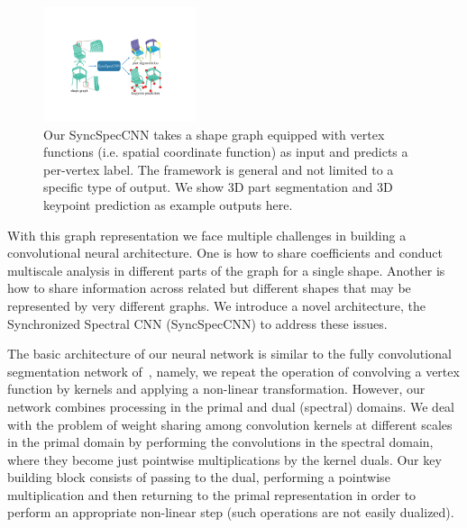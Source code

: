 \begin{figure}
    \centering
    \includegraphics[width=0.4\textwidth]{./fig/teaser3.pdf}
    \caption{Our SyncSpecCNN takes a shape graph equipped with vertex functions (i.e. spatial coordinate function) as input and predicts a per-vertex label. The framework is general and not limited to a specific type of output. We show 3D part segmentation and 3D keypoint prediction as example outputs here. }
    \label{fig:teaser}
    \vspace{-0.3cm}

\end{figure}

With this graph representation we face multiple challenges in building a convolutional neural architecture. One is how to share coefficients and conduct multiscale analysis in different parts of the graph for a single shape. Another is how to share information across related but different shapes that may be represented by very different graphs. We introduce a novel architecture, the Synchronized Spectral CNN (SyncSpecCNN) to address these issues. 

The basic architecture of our neural network is similar to the fully convolutional segmentation network of~\cite{long2015fully}, namely, we repeat the operation of convolving a vertex function by kernels and applying a non-linear transformation. However, our network combines processing in the primal and dual (spectral) domains. %
We deal with the problem of weight sharing among convolution kernels at different scales in the primal domain by performing the convolutions in the spectral domain, where they become just pointwise multiplications by the kernel duals. %
Our key building block consists of passing to the dual, performing a pointwise multiplication and then returning to the primal representation in order to perform an appropriate non-linear step (such operations are not easily dualized).

